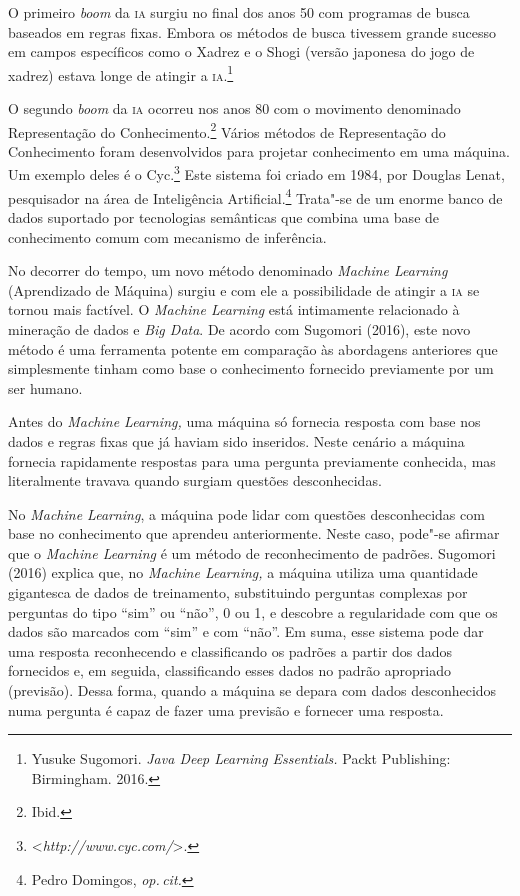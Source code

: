 O primeiro \emph{boom} da \textsc{ia} surgiu no final dos anos 50 com programas
de busca baseados em regras fixas. Embora os métodos de busca tivessem
grande sucesso em campos específicos como o Xadrez e o Shogi (versão
japonesa do jogo de xadrez) estava longe de atingir a \textsc{ia}.\footnote{Yusuke Sugomori. \emph{Java Deep Learning Essentials.} Packt
Publishing: Birmingham. 2016.}

O segundo \emph{boom} da \textsc{ia} ocorreu nos anos 80 com o movimento
denominado Representação do Conhecimento.\footnote{Ibid.} Vários
métodos de Representação do Conhecimento foram desenvolvidos para
projetar conhecimento em uma máquina. Um exemplo deles é o Cyc.\footnote{\textless{}\emph{http://www.cyc.com/}\textgreater{}.}
Este sistema foi criado em 1984, por Douglas Lenat, pesquisador na área
de Inteligência Artificial.\footnote{Pedro Domingos, \textit{op.\,cit.}}
Trata"-se de um enorme banco
de dados suportado por tecnologias semânticas que combina uma base de
conhecimento comum com mecanismo de inferência.

No decorrer do tempo, um novo método denominado \emph{Machine Learning}
(Aprendizado de Máquina) surgiu e com ele a possibilidade de atingir a
\textsc{ia} se tornou mais factível. O \emph{Machine Learning} está intimamente
relacionado à mineração de dados e \emph{Big Data}. De acordo com
Sugomori (2016), este novo método é uma ferramenta potente em comparação
às abordagens anteriores que simplesmente tinham como base o
conhecimento fornecido previamente por um ser humano.

Antes do \emph{Machine Learning,} uma máquina só fornecia resposta com
base nos dados e regras fixas que já haviam sido inseridos. Neste
cenário a máquina fornecia rapidamente respostas para uma pergunta
previamente conhecida, mas literalmente travava quando surgiam questões
desconhecidas.

No \emph{Machine Learning}, a máquina pode lidar com questões
desconhecidas com base no conhecimento que aprendeu anteriormente. Neste
caso, pode"-se afirmar que o \emph{Machine Learning} é um método de
reconhecimento de padrões. Sugomori (2016) explica que, no \emph{Machine
Learning,} a máquina utiliza uma quantidade gigantesca de dados de
treinamento, substituindo perguntas complexas por perguntas do tipo
``sim'' ou ``não'', 0 ou 1, e descobre a regularidade com que os dados
são marcados com ``sim'' e com ``não''. Em suma, esse sistema pode dar
uma resposta reconhecendo e classificando os padrões a partir dos dados
fornecidos e, em seguida, classificando esses dados no padrão apropriado
(previsão). Dessa forma, quando a máquina se depara com dados
desconhecidos numa pergunta é capaz de fazer uma previsão e fornecer uma
resposta.

